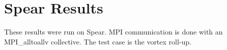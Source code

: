 %    

%
%


\chapter{Spear Results}

These results were run on Spear. MPI communication is done with an MPI\_alltoallv collective. The test case is the vortex roll-up. 

